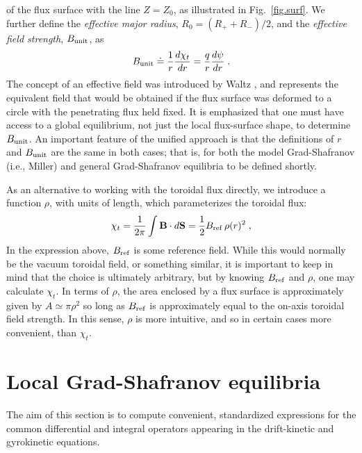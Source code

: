 of the flux surface with the line $Z=Z_0$, as illustrated in 
Fig.~\ref{fig.surf}.  We further define the {\it effective major 
radius}, $R_0 = (R_++R_-)/2$, and the {\it effective field 
strength}, $B_{\rm unit}$, as
%
\begin{equation}
B_{\rm unit} \doteq \frac{1}{r}\frac{d \chi_t}{dr} 
 = \frac{q}{r}\frac{d \psi}{dr}\; .
\end{equation}
%
The concept of an effective field was introduced by Waltz 
\cite{waltz:1999}, and represents the equivalent field that 
would be obtained if the flux surface was deformed to a 
circle with the penetrating flux held fixed.  It is 
emphasized that one must have access to a global 
equilibrium, not just the local flux-surface shape, to determine 
$B_{\rm unit}$.  An important feature of the unified approach is 
that the definitions of $r$ and $B_{\rm unit}$ are the 
same in both cases; that is, for both the model Grad-Shafranov 
(i.e., Miller) and general Grad-Shafranov equilibria to 
be defined shortly.

As an alternative to working with the toroidal flux directly, 
we introduce a function $\rho$, with units of length, which 
parameterizes the toroidal flux:
%
\begin{equation}
\chi_t = \frac{1}{2\pi} \int {\mathbf B} \cdot d{\mathbf S} = \frac{1}{2}
B_{\rm ref} \, \rho(r)^2 \; ,
\end{equation}
%
In the expression above, $B_{\rm ref}$ is some reference field.  
While this would normally be the vacuum toroidal field, or 
something similar, it is important to keep in mind that the 
choice is ultimately arbitrary, but by knowing $B_{\rm ref}$ 
and $\rho$, one may calculate $\chi_t$.  In terms of $\rho$, 
the area enclosed by a flux surface is approximately given 
by $A \simeq \pi\rho^2$ so long as $B_{\rm ref}$ is approximately 
equal to the on-axis toroidal field strength.  In this sense, 
$\rho$ is more intuitive, and so in certain cases more convenient, 
than $\chi_t$.

\section{Local Grad-Shafranov equilibria}
\label{sec.local}

The aim of this section is to compute convenient, standardized 
expressions for the common differential and integral operators 
appearing in the drift-kinetic and gyrokinetic equations.  

